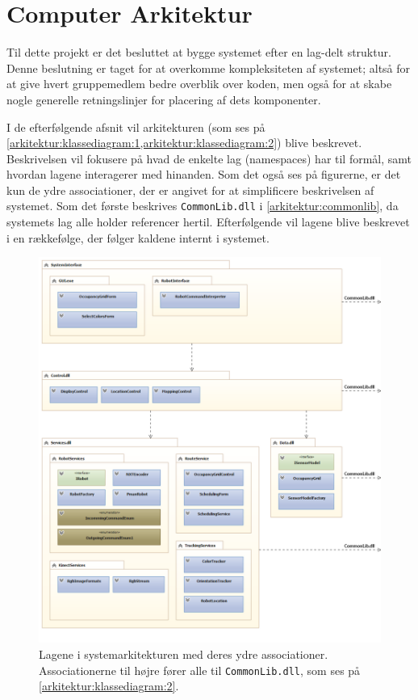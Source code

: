 \label{arkitektur}
\section{Computer Arkitektur}
Til dette projekt er det besluttet at bygge systemet efter en lag-delt struktur.
Denne beslutning er taget for at overkomme kompleksiteten af systemet; altså for at give hvert gruppemedlem bedre overblik over koden, men også for at skabe nogle generelle retningslinjer for placering af dets komponenter.

I de efterfølgende afsnit vil arkitekturen (som ses på  \cref{arkitektur:klassediagram:1,arkitektur:klassediagram:2}) blive beskrevet.
Beskrivelsen vil fokusere på hvad de enkelte lag (namespaces) har til formål, samt hvordan lagene interagerer med hinanden.
Som det også ses på figurerne, er det kun de ydre associationer, der er angivet for at simplificere beskrivelsen af systemet.
Som det første beskrives \lstinline[style=csharp]!CommonLib.dll! i \cref{arkitektur:commonlib}, da systemets lag alle holder referencer hertil.
Efterfølgende vil lagene blive beskrevet i en rækkefølge, der følger kaldene internt i systemet.
\begin{figure}
\centering
\includegraphics[width=1\textwidth]{./graphics/systemarkitektur_1}
\caption{Lagene i systemarkitekturen med deres ydre associationer. Associationerne til højre fører alle til \lstinline[style=csharp]!CommonLib.dll!, som ses på \cref{arkitektur:klassediagram:2}.}
\label{arkitektur:klassediagram:1}
\end{figure}


